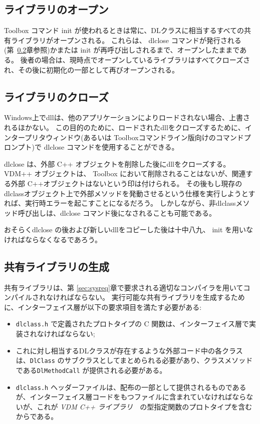 \documentclass[\pformat,12pt]{jarticle}
\newcommand{\vdmcpplib}{\textit{VDM C++ ライブラリ}}
\begin{document}
\subsection{ライブラリのオープン}

Toolbox コマンド \textsf{init} が使われるときは常に、DLクラスに相当するすべての共有ライブラリがオープンされる。
これらは、 \textsf{dlclose} コマンドが発行される (第~\ref{sec:dlclose}章参照)かまたは \textsf{init} が再呼び出しされるまで、オープンしたままである。
後者の場合は、現時点でオープンしているライブラリはすべてクローズされ、その後に初期化の一部として再びオープンされる。

\subsection{ライブラリのクローズ}\label{sec:dlclose}

Windows上でdllは、他のアプリケーションによりロードされない場合、上書されるほかない。
この目的のために、ロードされたdllをクローズするために、インタープリタウィンドウ(あるいは Toolboxコマンドライン版向けのコマンドプロンプト)で \textsf{dlclose} コマンドを使用することができる。

\textsf{dlclose} は、外部 C++ オブジェクトを削除した後にdllをクローズする。
 VDM++ オブジェクトは、 Toolbox において削除されることはないが、関連する外部 C++オブジェクトはないという印は付けられる。 
その後もし現存のdlclassオブジェクト上で外部メソッドを発動させるという仕様を実行しようとすれば、実行時エラーを起こすことになるだろう。
しかしながら、非dlclassメソッド呼び出しは、\textsf{dlclose} コマンド後になされることも可能である。

おそらく\textsf{dlclose} の後および新しいdllをコピーした後は十中八九、 \textsf{init} を用いなければならなくなるであろう。



\subsection{共有ライブラリの生成}\label{sec:create}

共有ライブラリは、第 \ref{sec:sysreq}章で要求される適切なコンパイラを用いてコンパイルされなければならない。
実行可能な共有ライブラリを生成するために、インターフェイス層が以下の要求項目を満たす必要がある:
\begin{itemize}
\item \texttt{dlclass.h} で定義されたプロトタイプの C 関数は、インターフェイス層で実装されなければならない;
\item これに対し相当するDLクラスが存在するような外部コード中の各クラスは、\texttt{DlClass} のサブクラスとしてまとめられる必要があり、クラスメソッドである\texttt{DlMethodCall} が提供される必要がある。
\item {\tt dlclass.h} ヘッダーファイルは、配布の一部として提供されるものであるが、インターフェイス層コードをもつファイルに含まれていなければならないが、これが \vdmcpplib　の型指定関数のプロトタイプを含むからである。
\end{itemize}
\end{document}
